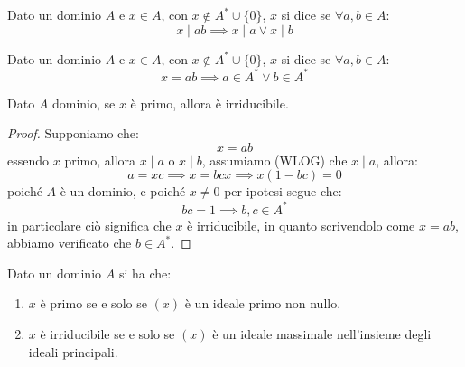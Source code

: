 \documentclass[11pt]{scrartcl}
\begin{document}
\begin{definition}
    Dato un dominio $A$ e $x\in A$, con $x \not\in A^* \cup \{0\}$, $x$ si dice  se $\forall a,b \in A$:
    \[ x \mid ab \implies x \mid a \vee x \mid b
        \]
\end{definition}

\begin{definition}
    Dato un dominio $A$ e $x\in A$, con $x \not\in A^* \cup \{0\}$, $x$ si dice  se $\forall a,b \in A$:
    \[ x = ab \implies a \in A^* \vee b \in A^*
        \]
\end{definition}

\begin{proposition}
    \label{2.58}
    Dato $A$ dominio, se $x$ è primo, allora è irriducibile.
\end{proposition}

\begin{proof}
    Supponiamo che:
    \[ x = ab
        \]
    essendo $x$ primo, allora $x \mid a$ o $x \mid b$, assumiamo (WLOG) che $x \mid a$, allora:
    \[ a = xc \implies x = bcx \implies x(1-bc) = 0
        \]
    poiché $A$ è un dominio, e poiché $x \ne 0$ per ipotesi segue che:
    \[ bc = 1 \implies b,c \in A^*
        \]
    in particolare ciò significa che $x$ è irriducibile, in quanto scrivendolo come $x = ab$, abbiamo verificato che $b \in A^*$.
\end{proof}

\begin{proposition}
    \label{2.86}
    Dato un dominio $A$ si ha che:
    \begin{enumerate}[(1)]
        \item $x$ è primo se e solo se $(x)$ è un ideale primo non nullo.
        \item $x$ è irriducibile se e solo se $(x)$ è un ideale massimale nell'insieme degli ideali principali.
    \end{enumerate}
\end{proposition}
\end{document}

